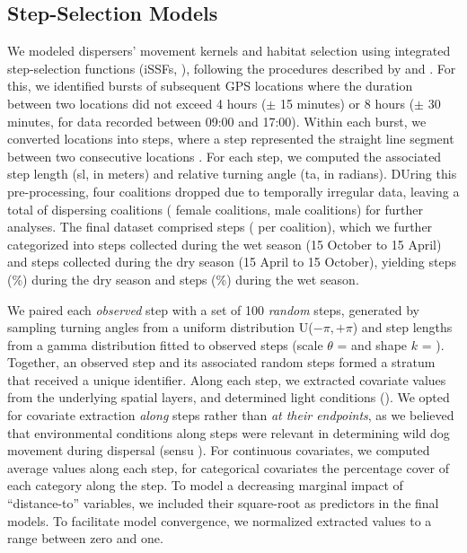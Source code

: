 \documentclass[abstract=on,10pt,a4paper,bibliography=totocnumbered]{article}
\newcommand{\inputy}[1]{\unskip}
\begin{document}
\subsection{Step-Selection Models}

We modeled dispersers' movement kernels and habitat selection using integrated
step-selection functions (iSSFs, \citealp{Fortin.2005, Avgar.2016}), following
the procedures described by \citet{Muff.2020} and \citet{Fieberg.2021}. For
this, we identified bursts of subsequent GPS locations where the duration
between two locations did not exceed 4 hours (\(\pm\) 15 minutes) or 8 hours
(\(\pm\) 30 minutes, for data recorded between 09:00 and 17:00). Within each
burst, we converted locations into steps, where a step represented the straight
line segment between two consecutive locations \citep{Turchin.1998}. For each
step, we computed the associated step length (sl, in meters) and relative
turning angle (ta, in radians). DUring this pre-processing, four coalitions
dropped due to temporally irregular data, leaving a total of
\inputy{GeneralMetrics/SSFTotal} dispersing coalitions
(\inputy{GeneralMetrics/SSFFemales} female coalitions,
\inputy{GeneralMetrics/SSFMales} male coalitions) for further analyses. The
final dataset comprised \inputy{GeneralMetrics/StepsTotal} steps
(\inputy{GeneralMetrics/StepsMeanSD} per coalition), which we further
categorized into steps collected during the wet season (15 October to 15 April)
and steps collected during the dry season (15 April to 15 October), yielding
\inputy{GeneralMetrics/NumberStepsDry} steps
(\inputy{GeneralMetrics/PercentageStepsDry}\%) during the dry season and
\inputy{GeneralMetrics/NumberStepsWet} steps
(\inputy{GeneralMetrics/PercentageStepsWet}\%) during the wet season.

We paired each \textit{observed} step with a set of 100 \textit{random} steps,
generated by sampling turning angles from  a uniform distribution U(\(-\pi,
+\pi\)) and step lengths from a gamma distribution fitted to observed steps
(scale \(\theta\) = \inputy{GeneralMetrics/GammaScale} and shape \(k\) =
\inputy{GeneralMetrics/GammaShape}). Together, an observed step and its
associated random steps formed a stratum that received a unique identifier.
Along each step, we extracted covariate values from the underlying spatial
layers, and determined light conditions (). We opted for
covariate extraction \textit{along} steps rather than \textit{at their
endpoints}, as we believed that environmental conditions along steps were
relevant in determining wild dog movement during dispersal (sensu
\citealp{Hofmann.2023}). For continuous covariates, we computed average values
along each step, for categorical covariates the percentage cover of each
category along the step. To model a decreasing marginal impact of
``distance-to'' variables, we included their square-root as predictors in the
final models. To facilitate model convergence, we normalized extracted values to
a range between zero and one.
\end{document}
